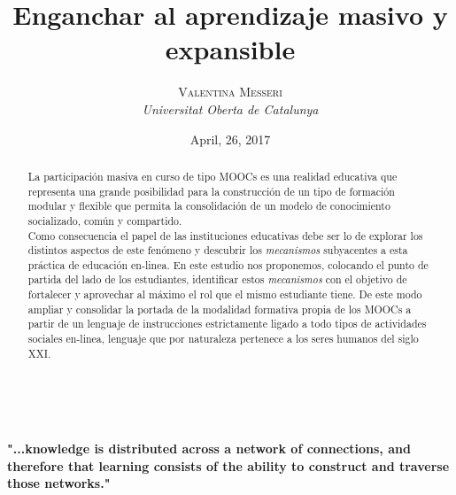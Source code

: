 \documentclass[10pt]{article}
\title{\textbf{Enganchar al aprendizaje masivo y expansible }\\ %
} %
\author{\textsc{Valentina Messeri} %
\\{\textit{Universitat Oberta de Catalunya}}} %
\date{April, 26, 2017} %
\makeatletter
\renewcommand{\maketitle}{ %
\begin{flushright} %
{\LARGE\@title} %

\vspace{10pt} %

{\large\@author} %
\\\@date %

\vspace{10pt} %
\end{flushright}
}
\makeatother
\begin{document}
\maketitle %



\begin{abstract}
La participación masiva en curso de tipo MOOCs es una realidad educativa que representa una grande posibilidad para la construcción de un tipo de formación modular y flexible que permita la consolidación de un modelo de conocimiento socializado, común y compartido. \\Como consecuencia el papel de las instituciones educativas debe ser lo de explorar los distintos aspectos de este fenómeno y descubrir los \textit{mecanismos} subyacentes a esta práctica de educación en-linea. En este estudio nos proponemos, colocando el punto de partida del lado de los estudiantes, identificar estos \textit{mecanismos} con el objetivo de fortalecer y aprovechar al máximo el rol que el mismo estudiante tiene. De este modo ampliar y consolidar la portada de la modalidad formativa propia de los MOOCs a partir de un lenguaje de instrucciones estrictamente ligado a todo tipos de actividades sociales en-linea, lenguaje que por naturaleza pertenece a los seres humanos del siglo XXI.\\  
\end{abstract}

\vspace{20pt} %

\begin{center}
    \begin{minipage}{0.9\linewidth}
    \vspace{5pt}%
        \textbf{ "...knowledge is distributed across a network of connections, and therefore that learning consists of the ability to construct and traverse those networks."
        }
        \begin{flushright}
        \citep {Dow12}
        \end{flushright}
    \vspace{5pt}%
    \end{minipage}
\end{center}
\renewcommand*\contentsname{Index}
\thispagestyle{empty} %
\end{document}
